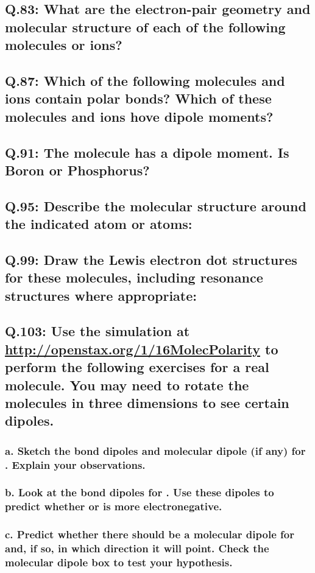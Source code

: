 \documentclass[11pt, letterpaper]{article}
\begin{document}
\subsection*{Q.83: What are the electron-pair geometry and molecular structure of each of the
following molecules or ions?}

\subsection*{Q.87: Which of the following molecules and ions contain polar bonds?
Which of these molecules and ions hove dipole moments?}

\subsection*{Q.91: The molecule  has a dipole moment.
Is  Boron or Phosphorus?}

\subsection*{Q.95: Describe the molecular structure around the indicated atom or atoms:}

\subsection*{Q.99: Draw the Lewis electron dot structures for these molecules, including
resonance structures where appropriate:}

\subsection*{Q.103: Use the simulation at \url{http://openstax.org/1/16MolecPolarity}
to perform the following exercises for a real molecule.
You may need to rotate the molecules in three dimensions to see certain dipoles.}

\subsubsection*{a. Sketch the bond dipoles and molecular dipole (if any) for .
Explain your observations.}

\subsubsection*{b. Look at the bond dipoles for .
Use these dipoles to predict whether  or  is more electronegative.}

\subsubsection*{c. Predict whether there should be a molecular dipole for  and,
if so, in which direction it will point.
Check the molecular dipole box to test your hypothesis.}
\end{document}
